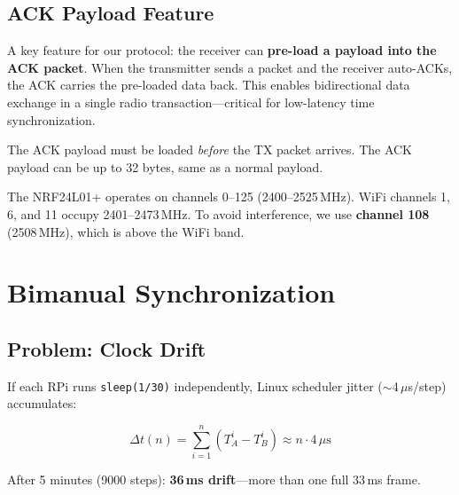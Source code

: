 \documentclass[11pt,a4paper]{article}
\begin{document}
\subsection{ACK Payload Feature}

A key feature for our protocol: the receiver can \textbf{pre-load a payload into the ACK packet}. When the transmitter sends a packet and the receiver auto-ACKs, the ACK carries the pre-loaded data back. This enables bidirectional data exchange in a single radio transaction---critical for low-latency time synchronization.

The ACK payload must be loaded \emph{before} the TX packet arrives. The ACK payload can be up to 32 bytes, same as a normal payload.

\begin{infobox}
The NRF24L01+ operates on channels 0--125 (2400--2525\,MHz). WiFi channels 1, 6, and 11 occupy 2401--2473\,MHz. To avoid interference, we use \textbf{channel 108} (2508\,MHz), which is above the WiFi band.
\end{infobox}


\section{Bimanual Synchronization}

\subsection{Problem: Clock Drift}

If each RPi runs \texttt{sleep(1/30)} independently, Linux scheduler jitter (${\sim}$4\,$\mu$s/step) accumulates:

\begin{equation}
\Delta t(n) = \sum_{i=1}^{n}(T_A^i - T_B^i) \approx n \cdot 4\,\mu\text{s}
\label{eq:drift}
\end{equation}

After 5 minutes (9000 steps): \textbf{36\,ms drift}---more than one full 33\,ms frame.

\end{document}
